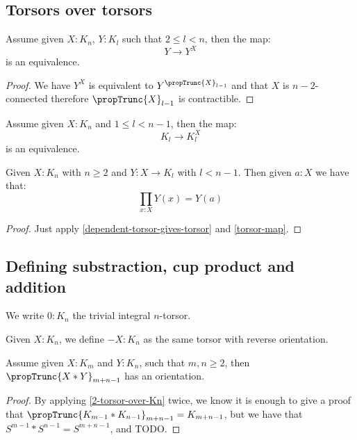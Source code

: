 \subsection{Torsors over torsors}

\begin{lemma}\label{torsor-map}
Assume given $X:K_n$, $Y:K_l$ such that $2\leq l<n$, then the map:
\[Y\to Y^X\]
is an equivalence.
\end{lemma}

\begin{proof}
We have $Y^X$ is equivalent to $Y^{\propTrunc{X}_{l-1}}$ and that $X$ is $n-2$-connected therefore $\propTrunc{X}_{l-1}$ is contractible.
\end{proof}

\begin{corollary}\label{dependent-torsor-gives-torsor}
Assume given $X:K_n$ and $1\leq l<n-1$, then the map:
\[K_l\to K_l^X\]
is an equivalence.
\end{corollary}

\begin{lemma}\label{integral-torsor-over-Kn}
Given $X:K_n$ with $n\geq 2$ and $Y:X\to K_l$ with $l<n-1$. Then given $a:X$ we have that:
\[\prod_{x:X} Y(x) = Y(a)\]
\end{lemma}

\begin{proof}
Just apply \cref{dependent-torsor-gives-torsor} and \cref{torsor-map}.
\end{proof}


\subsection{Defining substraction, cup product and addition}

We write $0:K_n$ the trivial integral $n$-torsor.

\begin{definition}
Given $X:K_n$, we define $-X:K_n$ as the same torsor with reverse orientation.
\end{definition}

\begin{lemma}
Assume given $X:K_{m}$ and $Y:K_{n}$, such that $m,n\geq 2$, then $\propTrunc{X*Y}_{m+n-1}$ has an orientation.
\end{lemma}

\begin{proof}
By applying \cref{2-torsor-over-Kn} twice, we know it is enough to give a proof that $\propTrunc{K_{m-1}*K_{n-1}}_{m+n-1} = K_{m+n-1}$, but we have that $S^{m-1}*S^{n-1} = S^{m+n-1}$, and TODO.
\end{proof}

